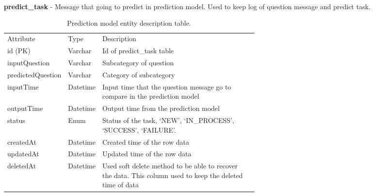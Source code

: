 \documentclass[12pt,oneside,openright,a4paper]{cpe-english-project}
\begin{document}
\textbf{predict\_task} - Message that going to predict in prediction model. Used to keep log of question message and predict task.
\begin{table}[ht]
	\caption{Prediction model entity description table.}
	\label{tab:Prediction model entity description table.}
\begin{adjustbox}{width=\textwidth}
\begin{tabular}{llp{0.6\linewidth}l}
\rowcolor[HTML]{5B9BD5} 
Attribute         & Type     & Description                                                                                                 \\
\rowcolor[HTML]{DEEAF6} 
id (PK)           & Varchar  & Id of predict\_task table                                                                                   \\
inputQuestion     & Varchar  & Subcategory of question                                                                                     \\
\rowcolor[HTML]{DEEAF6} 
predictedQuestion & Varchar  & Category of subcategory                                                                                     \\
inputTime         & Datetime & Input time that the   question message go to compare in the prediction model                                \\
\rowcolor[HTML]{DEEAF6} 
outputTime        & Datetime & Output time from the prediction model                                                                       \\
status            & Enum     & Status of the task,   ‘NEW’, ‘IN\_PROCESS’, ‘SUCCESS’, ‘FAILURE’.                                           \\
\rowcolor[HTML]{DEEAF6} 
createdAt         & Datetime & Created time of the row data                                                                                \\
updatedAt         & Datetime & Updated time of the row   data                                                                              \\
\rowcolor[HTML]{DEEAF6} 
deletedAt         & Datetime & Used soft delete method to be able to recover the data. This column   used to keep the deleted time of data
\end{tabular}
\end{adjustbox}
\end{table}
\end{document}
